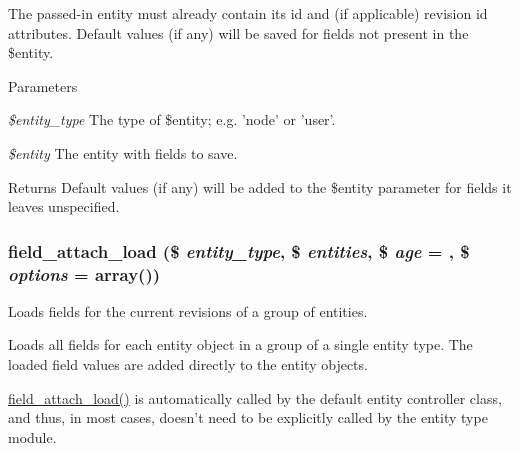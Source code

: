 The passed-\/in entity must already contain its id and (if applicable) revision id attributes. Default values (if any) will be saved for fields not present in the \$entity.


\begin{DoxyParams}{Parameters}
\item[{\em \$entity\_\-type}]The type of \$entity; e.g. 'node' or 'user'. \item[{\em \$entity}]The entity with fields to save. \end{DoxyParams}
\begin{DoxyReturn}{Returns}
Default values (if any) will be added to the \$entity parameter for fields it leaves unspecified. 
\end{DoxyReturn}
\hypertarget{group__field__attach_ga1e92543395961c912eb293b50e991586}{
\subsubsection[{field\_\-attach\_\-load}]{\setlength{\rightskip}{0pt plus 5cm}field\_\-attach\_\-load (\$ {\em entity\_\-type}, \/  \$ {\em entities}, \/  \$ {\em age} = {}, \/  \$ {\em options} = {\ttfamily array()})}}
\label{group__field__attach_ga1e92543395961c912eb293b50e991586}
Loads fields for the current revisions of a group of entities.

Loads all fields for each entity object in a group of a single entity type. The loaded field values are added directly to the entity objects.

\hyperlink{group__field__attach_ga1e92543395961c912eb293b50e991586}{field\_\-attach\_\-load()} is automatically called by the default entity controller class, and thus, in most cases, doesn't need to be explicitly called by the entity type module.


